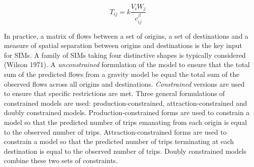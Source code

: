 \documentclass[11pt,letterpaper]{article}
\begin{document}
\[
T_{i j}=k \frac{V_{i} W_{j}}{c_{i j}^{\beta}}
\]

In practice, a matrix of flows between a set of origins, a set of destinations and a measure of spatial separation between origins and destinations is the key input for SIMs.
A family of SIMs taking four distinctive shapes is typically considered (Wilson 1971).
A \emph{unconstrained} formulation of the model to ensure that the total sum of the predicted flows from a gravity model be equal the total sum of the observed flows across all origins and destinations.
\emph{Constrained} versions are used to ensure that specific restrictions are met.
Three general formulations of constrained models are used: production-constrained, attraction-constrained and doubly constrained models.
Production-constrained forms are used to constrain a model so that the predicted number of trips emanating from each origin is equal to the observed number of trips.
Attraction-constrained forms are used to constrain a model so that the predicted number of trips terminating at each destination is equal to the observed number of trips.
Doubly constrained models combine these two sets of constraints.
\end{document}
